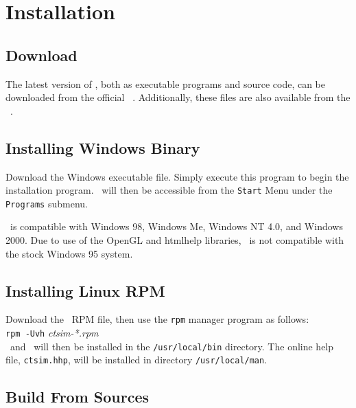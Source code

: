 \chapter{Installation}\label{installation}%
%
\ctsimfooter%

\section{Download}\label{download}%

The latest version of \ctsim, both as executable programs and source code,
 can be downloaded from the official
 \ctsim\ . Additionally, these
 files are also available from the \ctsim\ .


\section{Installing Windows Binary}

Download the Windows executable file.
Simply execute this program to begin the
installation program. \ctsim\ will then be accessible from the
\texttt{Start} Menu under the \texttt{Programs} submenu.

\ctsim\ is compatible with Windows 98, Windows Me, Windows NT 4.0,
and Windows 2000. Due to use of the OpenGL and htmlhelp libraries,
\ctsim\ is not compatible with the stock Windows 95 system.

\section{Installing Linux RPM}
Download the \ctsim\ RPM file, then use
the \texttt{rpm} manager program as follows:\\
\hspace*{1cm}\texttt{rpm -Uvh} \emph{ctsim-*.rpm}\\

\ctsim\ and \ctsimtext\ will then be installed in the \texttt{/usr/local/bin}
directory. The online help file, \texttt{ctsim.hhp}, will be installed in
directory \texttt{/usr/local/man}.

\section{Build From Sources}\label{build}

